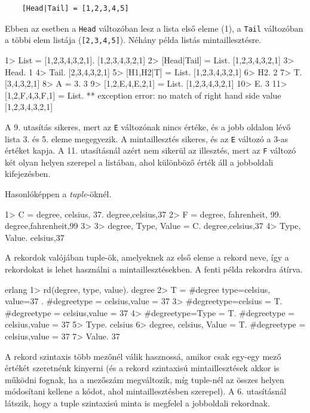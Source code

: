 \documentclass[12pt, a4paper, oneside]{book}
\begin{document}
\begin{verbatim}
    [Head|Tail] = [1,2,3,4,5]
\end{verbatim}

\noindent Ebben az esetben a \texttt{Head} változóban lesz a lista első eleme (1), a
\texttt{Tail} változóban a többi elem listája (\texttt{[2,3,4,5]}). Néhány
példa listás mintaillesztésre.

\begin{code}{}{}
1> List = [1,2,3,4,3,2,1].
[1,2,3,4,3,2,1]
2> [Head|Tail] = List.
[1,2,3,4,3,2,1]
3> Head.
1
4> Tail.
[2,3,4,3,2,1]
5> [H1,H2|T] = List.
[1,2,3,4,3,2,1]
6> H2.
2
7> T.
[3,4,3,2,1]
8> A = 3.
3
9> [1,2,E,4,E,2,1] = List. 
[1,2,3,4,3,2,1]
10> E.
3
11> [1,2,F,4,3,F,1] = List.
** exception error: no match of right hand 
side value [1,2,3,4,3,2,1]
\end{code}

\noindent A 9. utasítás sikeres, mert az \texttt{E} változónak nincs értéke, és
a jobb oldalon lévő lista 3. és 5. eleme megegyezik. A mintaillesztés sikeres,
és az \texttt{E} változó a 3-as értéket kapja. A 11. utasításnál azért nem
sikerül az illesztés, mert az \texttt{F} változó két olyan helyen szerepel a
listában, ahol különböző érték áll a jobboldali kifejezésben.

\noindent Hasonlóképpen a \emph{tuple}-öknél.

\begin{code}{}{}
1> C = {degree, celsius, 37}.
{degree,celsius,37}
2> F = {degree, fahrenheit, 99}.
{degree,fahrenheit,99}
3> 
3> {degree, Type, Value} = C.
{degree,celsius,37}
4> {Type, Value}.
{celsius,37}
\end{code}

\noindent A rekordok valójában tuple-ök, amelyeknek az első eleme a rekord
neve, így a rekordokat is lehet használni a mintaillesztésekben. A fenti példa
rekordra átírva.

\begin{code}{erlang}{}
1> rd(degree, { type, value}).
degree
2> T = #degree{ type=celsius, value=37 }.
#degree{type = celsius,value = 37}
3> #degree{type=celsius} = T.
#degree{type = celsius,value = 37}
4> #degree{type=Type} = T.   
#degree{type = celsius,value = 37}
5> Type.
celsius
6> {degree, celsius, Value} = T.
#degree{type = celsius,value = 37}
7> Value.
37
\end{code}

\noindent A rekord szintaxis több mezőnél válik hasznossá, amikor csak egy-egy
mező értékét szeretnénk kinyerni (és a rekord szintaxisú mintaillesztések akkor
is működni fognak, ha a mezőszám megváltozik, míg tuple-nél az összes helyen
módosítani kellene a kódot, ahol mintaillesztésben szerepel). A 6. utasításnál
látszik, hogy a tuple szintaxisú minta is megfelel a jobboldali rekordnak.
\end{document}
